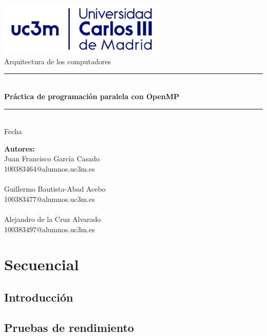 \documentclass[12pt]{article}
\begin{document}
    \begin{center}
    \includegraphics[width=80mm]{uc3m.png}
    \\ \vspace{40mm}
    \LARGE Arquitectura de los computadores
    \\
    \noindent\rule{12cm}{0.4pt}
    \\
    \vspace{5mm}
    \textbf{\Huge Práctica de programación paralela con OpenMP}
    \\
    \noindent\rule{12cm}{0.4pt}
    \\
    \large Fecha
    \end{center}
    \vspace{20mm}
    \textbf{\large Autores:}
    \normalsize \\
    Juan Francisco García Casado\\100383464@alumnos.uc3m.es
    \\ \\
    Guillermo Bautista-Abad Acebo\\100383477@alumnos.uc3m.es
    \\ \\
    Alejandro de la Cruz Alvarado\\100383497@alumnos.uc3m.es
    \newpage
    \tableofcontents
    \newpage
    \section{Secuencial}
        \subsection{Introducción}
        \noindent 
        \subsection{Pruebas de rendimiento}
        \noindent
    \newpage
\end{document}
